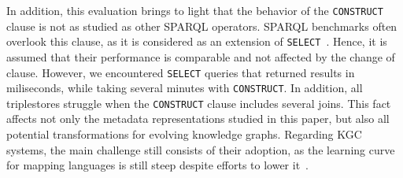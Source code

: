 In addition, this evaluation brings to light that the behavior of the \texttt{CONSTRUCT} clause is not as studied as other SPARQL operators. SPARQL benchmarks often overlook this clause, as it is considered as an extension of \texttt{SELECT}~\cite{schmidt2009sp}. Hence, it is assumed that their performance is comparable and not affected by the change of clause. However, we encountered \texttt{SELECT} queries that returned results in miliseconds, while taking several minutes with \texttt{CONSTRUCT}. 
In addition, all triplestores struggle when the \texttt{CONSTRUCT} clause includes several joins. This fact affects not only the metadata representations studied in this paper, but also all potential transformations for evolving knowledge graphs. Regarding KGC systems, the main challenge still consists of their adoption, as the learning curve for mapping languages is still steep despite efforts to lower it~\cite{iglesias2023yarrrml}.